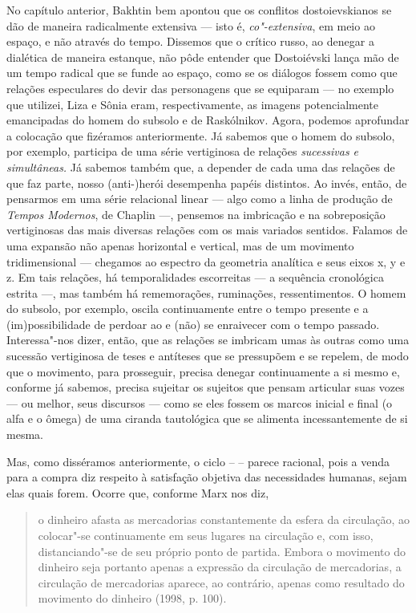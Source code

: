 No capítulo anterior, Bakhtin bem apontou que os conflitos
dostoievskianos se dão de maneira radicalmente extensiva --- isto é,
\emph{co"-extensiva}, em meio ao espaço, e não através do tempo. Dissemos
que o crítico russo, ao denegar a dialética de maneira estanque, não
pôde entender que Dostoiévski lança mão de um tempo radical que se funde
ao espaço, como se os diálogos fossem como que relações especulares do
devir das personagens que se equiparam --- no exemplo que utilizei, Liza
e Sônia eram, respectivamente, as imagens potencialmente emancipadas do
homem do subsolo e de Raskólnikov. Agora, podemos aprofundar a colocação
que fizéramos anteriormente. Já sabemos que o homem do subsolo, por
exemplo, participa de uma série vertiginosa de relações \emph{sucessivas
e simultâneas.} Já sabemos também que, a depender de cada uma das
relações de que faz parte, nosso \mbox{(anti-)herói} desempenha papéis
distintos. Ao invés, então, de pensarmos em uma série relacional linear
--- algo como a linha de produção de \emph{Tempos Modernos}, de Chaplin
---, pensemos na imbricação e na sobreposição vertiginosas das mais
diversas relações com os mais variados sentidos. Falamos de uma expansão
não apenas horizontal e vertical, mas de um movimento tridimensional ---
chegamos ao espectro da geometria analítica e seus eixos x, y e z. Em
tais relações, há temporalidades escorreitas --- a sequência cronológica
estrita ---, mas também há rememorações, ruminações, ressentimentos. O
homem do subsolo, por exemplo, oscila continuamente entre o tempo
presente e a (im)possibilidade de perdoar ao e (não) se enraivecer com o
tempo passado. Interessa"-nos dizer, então, que as relações se imbricam
umas às outras como uma sucessão vertiginosa de teses e antíteses que se
pressupõem e se repelem, de modo que o movimento, para prosseguir,
precisa denegar continuamente a si mesmo e, conforme já sabemos, precisa
sujeitar os sujeitos que pensam articular suas vozes --- ou melhor, seus
discursos --- como se eles fossem os marcos inicial e final (o alfa e o
ômega) de uma ciranda tautológica que se alimenta incessantemente de si
mesma.

Mas, como disséramos anteriormente, o ciclo  --  --  parece racional,
pois a venda para a compra diz respeito à satisfação objetiva das
necessidades humanas, sejam elas quais forem. Ocorre que, conforme Marx
nos diz,

\begin{quote}
o dinheiro afasta as mercadorias constantemente da esfera da circulação,
ao colocar"-se continuamente em seus lugares na circulação e, com isso,
distanciando"-se de seu próprio ponto de partida. Embora o movimento do
dinheiro seja portanto apenas a expressão da circulação de mercadorias,
a circulação de mercadorias aparece, ao contrário, apenas como resultado
do movimento do dinheiro (1998, p. 100).
\end{quote}

